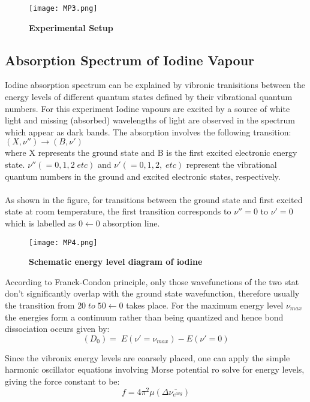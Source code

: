 \documentclass[9pt,a4paper]{article}
\begin{document}
\begin{multicols*}{2}
\begin{figure}[H]
\texttt{[image: MP3.png]}
\caption{\textbf{Experimental Setup}}
\label{fig2}
\end{figure}

\subsection{Absorption Spectrum of Iodine Vapour}
Iodine absorption spectrum can be explained by vibronic tranisitions between the energy levels of different quantum states defined by their vibrational quantum numbers. For this experiment Iodine vapours are excited by a source of white light and missing (absorbed) wavelengths of light  are observed in the spectrum which appear as dark bands. The absorption involves the following transition: $(X, \nu'') \rightarrow (B, \nu')$\\
where X represents the ground state and B is the first excited electronic energy state. $\nu'' (=0, 1, 2\; etc)$ and $\nu' (=0,1,2,\; etc)$ represent the vibrational quantum numbers in the ground and excited electronic states, respectively.\\\\
As shown in the figure, for transitions between the ground state and first excited state at room temperature, the first transition corresponds to $\nu'' =0$ to $\nu' = 0$ which is labelled as $0\leftarrow0$ absorption line.\\

\begin{figure}[H]
\texttt{[image: MP4.png]}
\caption{\textbf{Schematic energy level diagram of iodine}}
\label{fig3}
\end{figure}

According to Franck-Condon principle, only those wavefunctions of the two stat don't significantly overlap with the ground state wavefunction, therefore usually the transition from $20\;to\;50\leftarrow0$ takes place. For the maximum energy level $\nu_{max}$ the energies form a continuum rather than being quantized and hence bond dissociation occurs given by:
\[(D_0)=\;E(\nu'=\nu_{max})-E(\nu'=0)\]

Since the vibronix energy levels are coarsely placed, one can apply the simple harmonic oscillator equations involving Morse potential ro solve for energy levels, giving the force constant to be: 
\[f=4\pi^2 \mu(\Delta\bar{\nu_{e^{avg}}})\]





\end{multicols*}
\end{document}

